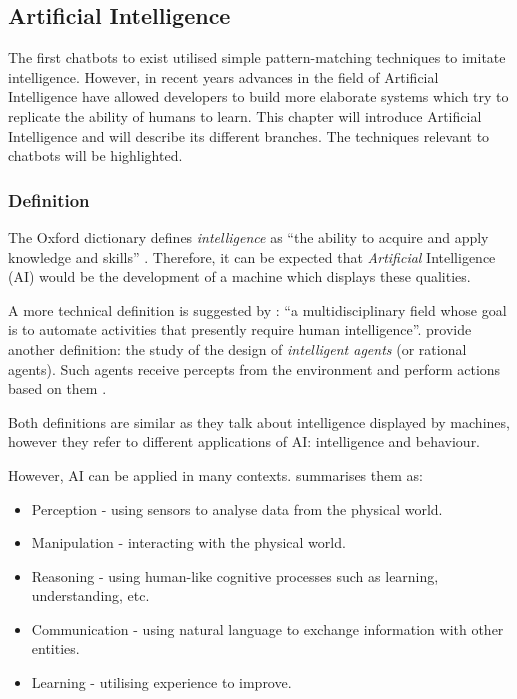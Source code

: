 \documentclass[12pt,a4paper]{article}
\begin{document}
\subsection{Artificial Intelligence}
The first chatbots to exist utilised simple pattern-matching techniques to imitate intelligence. However, in recent years advances in the field of Artificial Intelligence have allowed developers to build more elaborate systems which try to replicate the ability of humans to learn. This chapter will introduce Artificial Intelligence and will describe its different branches. The techniques relevant to chatbots will be highlighted.

\subsubsection{Definition}
The Oxford dictionary defines \textit{intelligence} as \enquote{the ability to acquire and apply knowledge and skills} \citep{intel:online}. Therefore, it can be expected that \textit{Artificial} Intelligence (AI) would be the development of a machine which displays these qualities.
 
A more technical definition is suggested by \citet{williams1983brief}: \enquote{a multidisciplinary field whose goal is to automate activities that presently require human intelligence}. \citet{Poole:1997:CIL:275594} provide another definition: the study of the design of \textit{intelligent agents} (or rational agents). Such agents receive percepts from the environment and perform actions based on them \citep{RusselStuart}.

Both definitions are similar as they talk about intelligence displayed by machines, however they refer to different applications of AI: intelligence and behaviour.

However, AI can be applied in many contexts. \citet{williams1983brief} summarises them as:
\begin{itemize}
    \item Perception - using sensors to analyse data from the physical world.
    \item Manipulation - interacting with the physical world.
    \item Reasoning - using human-like cognitive processes such as learning, understanding, etc.
    \item Communication - using natural language to exchange information with other entities.
    \item Learning - utilising experience to improve.
\end{itemize}
\end{document}
